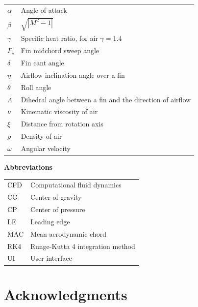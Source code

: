 \documentclass[a4paper,12pt,oneside]{book}
\begin{document}
\begin{tabular}{p{20mm}p{105mm}}
$\alpha$      & Angle of attack \\
$\beta$       & $\sqrt{|M^2-1|}$ \\
$\gamma$      & Specific heat ratio, for air $\gamma=1.4$ \\
$\Gamma_c$    & Fin midchord sweep angle \\
$\delta$      & Fin cant angle \\
$\eta$        & Airflow inclination angle over a fin \\
$\theta$      & Roll angle \\
$\Lambda$     & Dihedral angle between a fin and the direction of airflow \\
$\nu$         & Kinematic viscosity of air \\
$\xi$         & Distance from rotation axis \\
$\rho$        & Density of air \\
$\omega$      & Angular velocity \\

\end{tabular}

\vspace{10mm}
{\bf Abbreviations}
\nopagebreak

\begin{tabular}{p{20mm}p{105mm}}
CFD & Computational fluid dynamics \\
CG  & Center of gravity \\
CP  & Center of pressure \\
LE  & Leading edge \\
MAC & Mean aerodynamic chord \\
RK4 & Runge-Kutta 4 integration method \\
UI  & User interface \\
\end{tabular}




\pagebreak
{}
\setcounter{page}{1}










\clearpage
\vspace*{1cm}
\section*{Acknowledgments}
\end{document}
